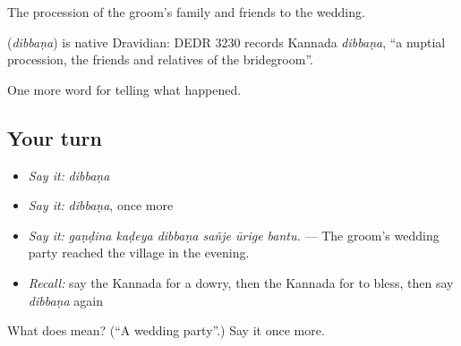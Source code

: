 The procession of the groom's family and friends to the wedding.

\begin{cousinweb}
\textbf{} (\emph{dibbaṇa}) is native Dravidian: DEDR 3230 records Kannada \emph{dibbaṇa}, \textquotedblleft{}a nuptial procession, the friends and relatives of the bridegroom\textquotedblright{}.
\end{cousinweb}

\begin{grammarlens}[title={What you've built}]
One more word for telling what happened.
\end{grammarlens}

\subsection*{Your turn}
\begin{itemize}
\raggedright
  \item \emph{Say it:} \emph{dibbaṇa}
  \item \emph{Say it:} \emph{dibbaṇa}, once more
  \item \emph{Say it:} \emph{gaṇḍina kaḍeya dibbaṇa sañje ūrige bantu.} — The groom's wedding party reached the village in the evening.
  \item \emph{Recall:} say the Kannada for a dowry, then the Kannada for to bless, then say \emph{dibbaṇa} again
\end{itemize}

\begin{tcolorbox}[breakable,colback=teal!4,colframe=teal!35!black,title={Before you move on}]
What does  mean? (\textquotedblleft{}A wedding party\textquotedblright{}.) Say it once more.
\end{tcolorbox}
